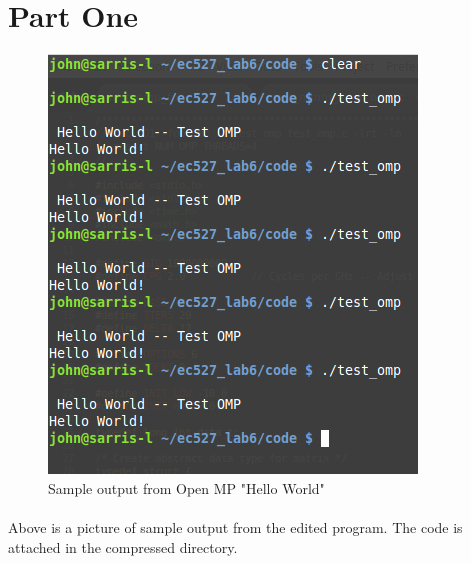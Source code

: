 \documentclass[10pt,8.5in,11in]{article}
\begin{document}
	\maketitle
	
\section{Part One}

\begin{figure}[h!]
  \includegraphics[width=\linewidth]{part_1.png}
  \caption{Sample output from Open MP "Hello World"}
  \label{fig:Hello World Open MP}
\end{figure}

\paragraph{}
Above is a picture of sample output from the edited program.  The code is attached in the compressed directory.
	
\end{document}
